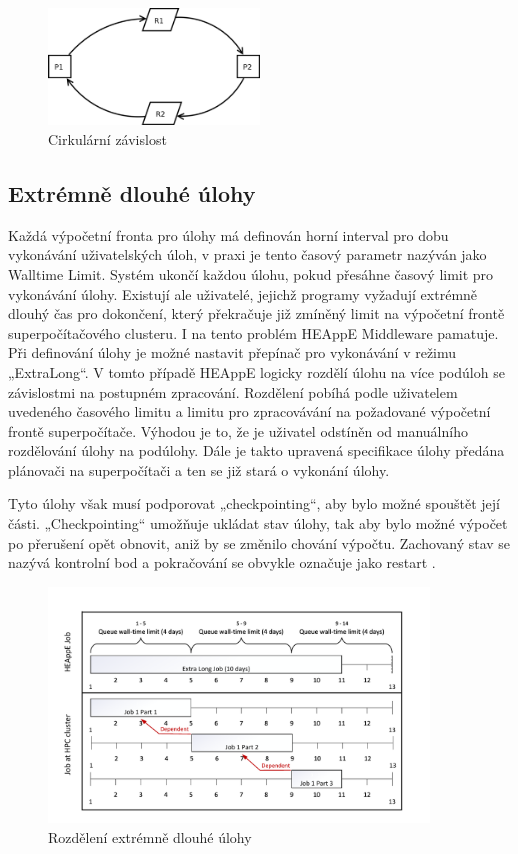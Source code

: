 \begin{figure}[!h]
	\centering
	\includegraphics[width=0.5\textwidth]{Figures/Process_deadlock.png}
	\caption{Cirkulární závislost \cite{OvBwjLleECKerU0E}}
	\label{fig:cirkularni-zavislost}
\end{figure}

\newpage
\subsection{Extrémně dlouhé úlohy}
Každá výpočetní fronta pro úlohy má definován horní interval pro dobu vykonávání uživatelských úloh, v praxi je tento časový parametr nazýván jako Walltime Limit. Systém ukončí každou úlohu, pokud přesáhne časový limit pro vykonávání úlohy. Existují ale uživatelé, jejichž programy vyžadují extrémně dlouhý čas pro dokončení, který překračuje již zmíněný limit na výpočetní frontě superpočítačového clusteru. I na tento problém HEAppE Middleware pamatuje. Při definování úlohy je možné nastavit přepínač pro vykonávání v režimu „ExtraLong“. V tomto případě HEAppE logicky rozdělí úlohu na více podúloh se závislostmi na postupném zpracování. Rozdělení pobíhá podle uživatelem uvedeného časového limitu a limitu pro zpracovávání na požadované výpočetní frontě superpočítače. Výhodou je to, že je uživatel odstíněn od manuálního rozdělování úlohy na podúlohy. Dále je takto upravená specifikace úlohy předána plánovači na superpočítači a ten se již stará o vykonání úlohy. 

Tyto úlohy však musí podporovat „checkpointing“, aby bylo možné spouštět její části. „Checkpointing“ umožňuje ukládat stav úlohy, tak aby bylo možné výpočet po přerušení opět obnovit, aniž by se změnilo chování výpočtu. Zachovaný stav se nazývá kontrolní bod a pokračování se obvykle označuje jako restart \cite{Padua2011}.

\hfill \break
\begin{figure}[h]
	\centering
	\includegraphics[width=0.9\textwidth]{Figures/ExtraLong.pdf}
	\caption{Rozdělení extrémně dlouhé úlohy }
	\label{fig:rozdeleni-extra-long}
\end{figure}